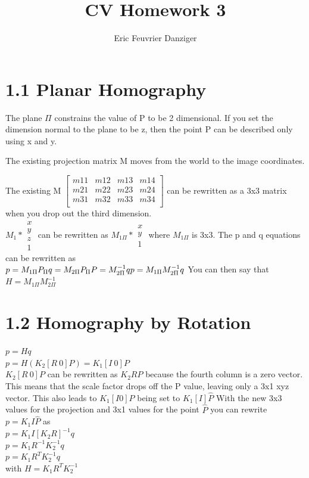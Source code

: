 \documentclass[11pt]{article}
\title{\textbf{CV Homework 3}}
\author{Eric Feuvrier Danziger\\
		}
\date{}
\begin{document}
\maketitle

\section*{1.1 Planar Homography}
The plane $\Pi$ constrains the value of P to be 2 dimensional. If you set the dimension normal to the plane to be z, then the point P can be described only using x and y. 

The existing projection matrix M moves from the world to the image coordinates. 

The existing M $ \begin{bmatrix}
m11 & m12 & m13 & m14\\
m21 & m22 & m23 & m24 \\
m31 & m32 & m33 & m34\\ \end{bmatrix} $
can be rewritten as a 3x3 matrix when you drop out the third dimension. 
\\
$M_1 * \begin{array} {c}
x \\
y \\
z \\
1 \end{array} $ can be rewritten as 
$ M_{1\Pi} * \begin{array} {c}
x \\
y \\
1 \end{array}$ where $M_{1\Pi}$ is 3x3. 
The p and q equations can be rewritten as \\
$p = M_{1\Pi} P_{\Pi} \\
q = M_{2\Pi} P_{\Pi} \\ 
P = M_{2\Pi}^{-1}q \\
p = M_{1\Pi}M_{2\Pi}^{-1}q$
You can then say that $H=M_{1\Pi}M_{2\Pi}^{-1}$

\section*{1.2 Homography by Rotation}
$p=Hq$\\
$p=H(K_2[R\ 0]P) = K_1[I\ 0]P$\\
$K_2[R\ 0]P$ can be rewritten as $K_2R\hat{P}$ because the fourth column is a zero vector. This means that the scale factor drops off the P value, leaving only a 3x1 xyz vector. 
This also leads to $K_1[I 0]P$ being set to $K_1[I]\hat{P}$
With the new 3x3 values for the projection and 3x1 values for the point $\hat{P}$ you can rewrite \\
$p = K_1I\hat{P}$ as \\
$p = K_1I[K_2R]^{-1}q$\\
$p = K_1R^{-1}K_2^{-1}q$\\
$p = K_1R^TK_2^{-1}q$\\
with $H = K_1R^TK_2^{-1}$
\end{document}
